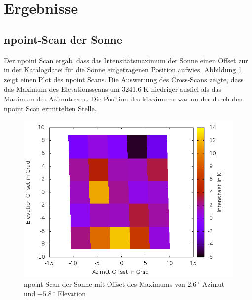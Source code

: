 \section{Ergebnisse}
\subsection{npoint-Scan der Sonne}
Der npoint Scan ergab, dass das Intensitätsmaximum der Sonne einen Offset zur in der Katalogdatei für die Sonne eingetragenen Position aufwies. Abbildung \ref{npoint_sun} zeigt einen Plot des npoint Scans.
Die Auswertung des Cross-Scans zeigte, dass das Maximum des Elevationsscans um 3241,6 K niedriger ausfiel als das Maximum des Azimutscans. Die Position des Maximums war an der durch den npoint Scan ermittelten Stelle.

\begin{figure}
\includegraphics[width=.8\textwidth]{images/npoint_sun_color.png}
\caption{npoint Scan der Sonne mit Offset des Maximums von $2.6\, ^\circ$ Azimut und $-5.8\,^\circ$ Elevation}
\label{npoint_sun}
\end{figure}

